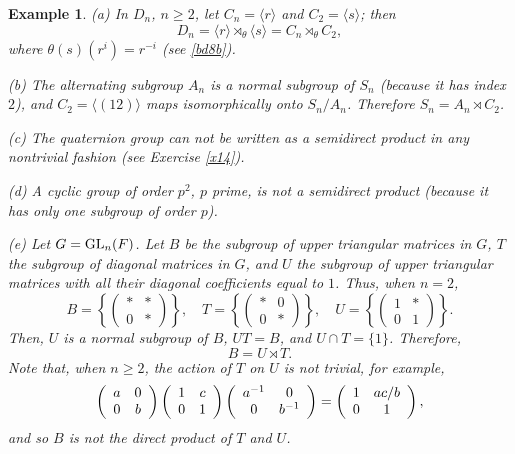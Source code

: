 \documentclass[a4paper,11pt,final,openany]{memoir}%
\newtheorem{example}[X]{Example}
\theoremstyle{nonumberplain}
\begin{document}
\begin{example}
\label{it14}(a) In $D_{n}$, $n\geq2$, let $C_{n}=\langle r\rangle$ and
$C_{2}=\langle s\rangle$; then
\[
D_{n}=\langle r\rangle\rtimes_{\theta}\langle s\rangle=C_{n}\rtimes_{\theta
}C_{2},
\]
where $\theta(s)(r^{i})=r^{-i}$ (see \ref{bd8b}).

(b) The alternating subgroup $A_{n}$ is a normal subgroup of $S_{n}$ (because
it has index $2$), and $C_{2}=\langle(12)\rangle$ maps isomorphically onto
$S_{n}/A_{n}$. Therefore $S_{n}=A_{n}\rtimes C_{2}$.

(c) The quaternion group can not be written as a semidirect product in any
nontrivial fashion (see Exercise \ref{x14}).

(d) A cyclic group of order $p^{2}$, $p$ prime, is not a semidirect product
(because it has only one subgroup of order $p$).

(e) Let $G=\operatorname{GL}_{n}(F)$. Let $B$ be the subgroup of upper triangular matrices
in $G$, $T$ the subgroup of diagonal matrices in $G$, and $U$ the subgroup of
upper triangular matrices with all their diagonal coefficients equal to $1$.
Thus, when $n=2$,%
\[
B=\left\{
\begin{pmatrix}
\ast & \ast\\
0 & \ast
\end{pmatrix}
\right\}  ,\quad T=\left\{
\begin{pmatrix}
\ast & 0\\
0 & \ast
\end{pmatrix}
\right\}  ,\quad U=\left\{
\begin{pmatrix}
1 & \ast\\
0 & 1
\end{pmatrix}
\right\}  \text{.}%
\]
Then, $U$ is a normal subgroup of $B$, $UT=B$, and $U\cap T=\{1\}$. Therefore,%
\[
B=U\rtimes T\text{.}%
\]
Note that, when $n\geq2$, the action of $T$ on $U$ is not trivial, for
example,%
\[
\left(
\begin{array}
[c]{cc}%
a & 0\\
0 & b
\end{array}
\right)  \left(
\begin{array}
[c]{cc}%
1 & c\\
0 & 1
\end{array}
\right)  \left(
\begin{array}
[c]{cc}%
a^{-1} & 0\\
0 & b^{-1}%
\end{array}
\right)  =\left(
\begin{array}
[c]{cc}%
1 & ac/b\\
0 & 1
\end{array}
\right)  ,
\]
and so $B$ is not the direct product of $T$ and $U$.
\end{example}
\end{document}
